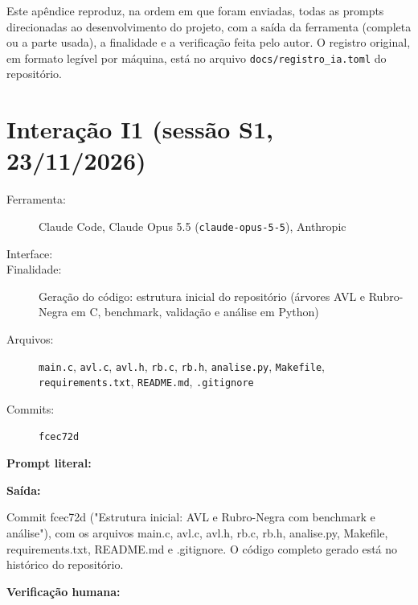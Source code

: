 Este apêndice reproduz, na ordem em que foram enviadas, todas as prompts direcionadas ao desenvolvimento do projeto, com a saída da ferramenta (completa ou a parte usada), a finalidade e a verificação feita pelo autor. O registro original, em formato legível por máquina, está no arquivo \texttt{docs/registro\_ia.toml} do repositório.

\section*{Interação I1 (sessão S1, 23/11/2026)}
{\raggedright
\begin{description}
    \item[Ferramenta:] Claude Code, Claude Opus 5.5 (\texttt{claude-opus-5-5}), Anthropic
    \item[Interface:] 
    \item[Finalidade:] Geração do código: estrutura inicial do repositório (árvores AVL e Rubro-Negra em C, benchmark, validação e análise em Python)
    \item[Arquivos:] \texttt{main.c}, \texttt{avl.c}, \texttt{avl.h}, \texttt{rb.c}, \texttt{rb.h}, \texttt{analise.py}, \texttt{Makefile}, \texttt{requirements.txt}, \texttt{README.md}, \texttt{.gitignore}
    \item[Commits:] \texttt{fcec72d}
\end{description}
}
\textbf{Prompt literal:}
\begin{registroia}
\end{registroia}
\textbf{Saída:}
\begin{registroia}
Commit fcec72d ("Estrutura inicial: AVL e Rubro-Negra com benchmark e análise"), com os arquivos main.c, avl.c, avl.h, rb.c, rb.h, analise.py, Makefile, requirements.txt, README.md e .gitignore. O código completo gerado está no histórico do repositório.
\end{registroia}
\textbf{Verificação humana:} 

